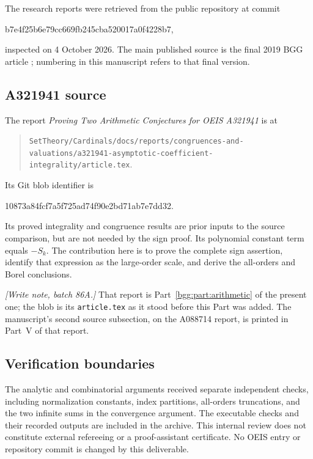 \documentclass[11pt,a4paper]{article}
\numberwithin{equation}{section}
\theoremstyle{definition}
\theoremstyle{remark}
\theoremstyle{definition}
\begin{document}
The research reports were retrieved from the public repository at
commit
\begin{center}\small\ttfamily
b7e4f25b6e79cc669fb245cba520017a0f4228b7,
\end{center}
inspected on 4 October 2026.
The main published source is the final 2019 BGG article
\cite{BGG}; numbering in this manuscript refers to that final
version.

\subsection*{A321941 source}

The report \emph{Proving Two Arithmetic Conjectures for OEIS A321941}
is at
\begin{quote}\small
\nolinkurl{SetTheory/Cardinals/docs/reports/congruences-and-valuations/a321941-asymptotic-coefficient-integrality/article.tex}.
\end{quote}
Its Git blob identifier is
\begin{center}\small\ttfamily
10873a84fcf7a5f725ad74f90e2bd71ab7e7dd32.
\end{center}
Its proved integrality and congruence results are prior inputs to
the source comparison, but are not needed by the sign proof.
Its polynomial constant term equals \(-S_k\).
The contribution here is to prove the complete sign assertion,
identify that expression as the large-order scale, and derive
the all-orders and Borel conclusions.

\emph{[Write note, batch 86A.]} That report is
Part~\ref{bgg:part:arithmetic} of the present one; the blob is its
\texttt{article.tex} as it stood before this Part was added. The
manuscript's second source subsection, on the A088714 report, is printed
in Part~V of that report.

\subsection*{Verification boundaries}

The analytic and combinatorial arguments received separate
independent checks, including normalization constants, index
partitions, all-orders truncations, and the two infinite sums in
the convergence argument.  The executable checks and their
recorded outputs are included in the archive.
This internal review does not constitute external refereeing or
a proof-assistant certificate.  No OEIS entry or repository
commit is changed by this deliverable.
\end{document}
